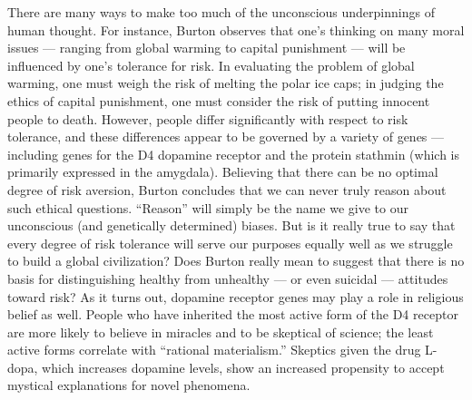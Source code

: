 \documentclass[a4paper,14pt]{extarticle}
\begin{document}
There are many ways to make too much of the unconscious underpinnings of human thought.
For instance, Burton observes that one’s thinking on many moral issues --- ranging from global warming to capital punishment --- will be influenced by one’s tolerance for risk.
In evaluating the problem of global warming, one must weigh the risk of melting the polar ice caps;
in judging the ethics of capital punishment, one must consider the risk of putting innocent people to death.
However, people differ significantly with respect to risk tolerance, and these differences appear to be governed by a variety of genes --- including genes for the D4 dopamine receptor and the protein stathmin (which is primarily expressed in the amygdala).
Believing that there can be no optimal degree of risk aversion, Burton concludes that we can never truly reason about such ethical questions.
``Reason'' will simply be the name we give to our unconscious (and genetically determined) biases.
But is it really true to say that every degree of risk tolerance will serve our purposes equally well as we struggle to build a global civilization?
Does Burton really mean to suggest that there is no basis for distinguishing healthy from unhealthy --- or even suicidal --- attitudes toward risk?
As it turns out, dopamine receptor genes may play a role in religious belief as well.
People who have inherited the most active form of the D4 receptor are more likely to believe in miracles and to be skeptical of science;
the least active forms correlate with ``rational materialism.''
Skeptics given the drug L-dopa, which increases dopamine levels, show an increased propensity to accept mystical explanations for novel phenomena.
\end{document}

